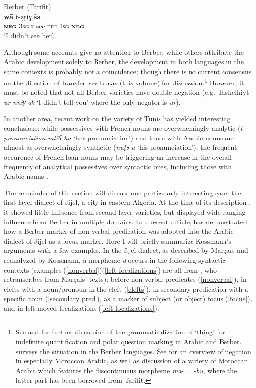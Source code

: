 \documentclass[output=paper]{langsci/langscibook}
\begin{document}
Berber (Tarifit)\\
\gll \textbf{wā}  t-ẓṛiɣ  \textbf{ša}\\
     \textbf{\textsc{neg}}  \textsc{3sg.f}-see.\textsc{prf}.\textsc{1sg}  \textbf{\textsc{neg}}\\
\glt `I didn’t see her'.
\z

Although some accounts give no attention to Berber, while others attribute the Arabic development solely to Berber, the development in both languages in the same contexts is probably not a coincidence; though there is no current consensus on the direction of transfer \textendash \,see Lucas (this volume) for discussion.\footnote{See \citet{Lucas2007,Lucas2010,Lucas2018} and \citet{Souag2018thing} for further discussion of the grammaticalization of `thing’ for indefinite quantification and polar question marking in Arabic and Berber. \citet[324–334]{Kossmann2013book} surveys the situation in the Berber languages. See \citet{Lafkioui2013reinventing} for an overview of negation in especially Moroccan Arabic, as well as discussion of a variety of Moroccan Arabic which features the discontinuous morpheme \textit{mā}{}- ... -\textit{bū}, where the latter part has been borrowed from Tarifit.} However, it must be noted that not all Berber varieties have double negation (e.g. Tashelhiyt \textit{ur} \textit{nniγ} \textit{ak} ‘I didn’t tell you’ where the only negator is \textit{ur}).

  In another area, recent work on the variety of Tunis has yielded interesting conclusions: while possessives with French nouns are overwhemingly analytic (\textit{l-prononciation} \textit{mtēʕ-ha} ‘her pronunciation’) and those with Arabic nouns are almost as overwhelmingly synthetic (\textit{nuṭq-u} ‘his pronunciation’), the frequent occurence of French loan nouns may be triggering an increase in the overall frequency of analytical possessives over syntactic ones, including those with Arabic nouns \citep{Sayahi2015}.

  The remainder of this section will discuss one particularly interesting case: the first-layer dialect of Jijel, a city in eastern Algeria. At the time of its description \citep{Marçais1956}, it showed little influence from second-layer varieties, but displayed wide-ranging influence from Berber in multiple domains. In a recent article, \citet{Kossmann2014} has demonstrated how a Berber marker of non-verbal predication was adopted into the Arabic dialect of Jijel as a focus marker. Here I will briefly summarize Kossmann’s arguments with a few examples. In the Jijel dialect, as described by Marçais and reanalyzed by Kossmann, a morpheme \textit{d} occurs in the following syntactic contexts (examples (\ref{nonverbal})\textendash(\ref{left focalizations}) are all from \citealt[129]{Kossmann2014}, who retranscribes from Marçais’ texts): before non-verbal predicates (\ref{nonverbal}), in clefts with a noun/pronoun in the cleft (\ref{clefts}), in secondary predication with a specific noun (\ref{secondary pred}), as a marker of subject (or object) focus (\ref{focus}), and in left-moved focalizations (\ref{left focalizations}).
\end{document}
